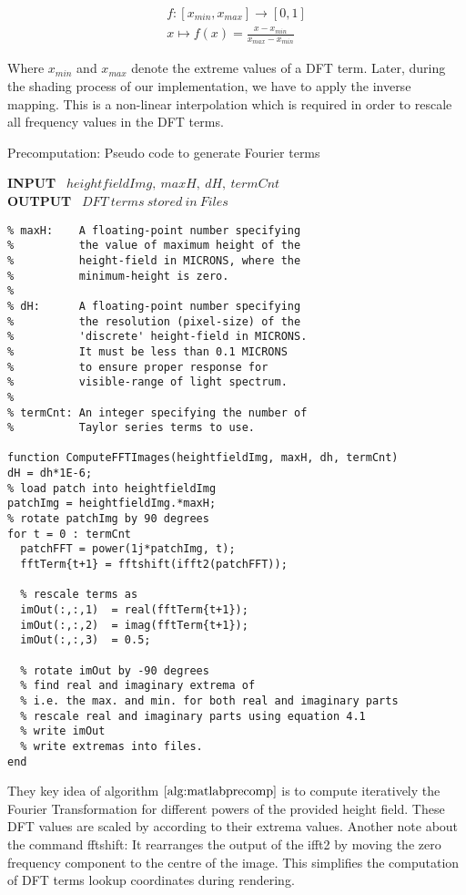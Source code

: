 \begin{align}
  f:\left[x_{min},x_{max}\right]\to \left[0,1\right] \nonumber\\
  x \mapsto f(x) = \frac{x-x_{min}}{x_{max}-x_{min}}
\label{eq:dfttermnormalization}
\end{align}

Where $x_{min}$ and $x_{max}$ denote the extreme values of a DFT term. Later, during the shading process of our implementation, we have to apply the inverse mapping. This is a non-linear interpolation which is required in order to rescale all frequency values in the DFT terms. 

\begin{algorithm}[H]
\caption{Precomputation: Pseudo code to generate Fourier terms}
\textbf{INPUT} \ $heightfieldImg, \ maxH, \ dH, \ termCnt$ \\
\textbf{OUTPUT} \ $DFT \ terms \ stored \ in \ Files$
\begin{lstlisting}
% maxH:    A floating-point number specifying 
%          the value of maximum height of the 
%          height-field in MICRONS, where the 
%          minimum-height is zero. 
%         
% dH:      A floating-point number specifying 
%          the resolution (pixel-size) of the 
%          'discrete' height-field in MICRONS. 
%          It must be less than 0.1 MICRONS 
%          to ensure proper response for 
%          visible-range of light spectrum.
%
% termCnt: An integer specifying the number of 
%          Taylor series terms to use.

function ComputeFFTImages(heightfieldImg, maxH, dh, termCnt)
dH = dh*1E-6;
% load patch into heightfieldImg
patchImg = heightfieldImg.*maxH;
% rotate patchImg by 90 degrees
for t = 0 : termCnt
  patchFFT = power(1j*patchImg, t);
  fftTerm{t+1} = fftshift(ifft2(patchFFT));
  
  % rescale terms as
  imOut(:,:,1)  = real(fftTerm{t+1});
  imOut(:,:,2)  = imag(fftTerm{t+1});
  imOut(:,:,3)  = 0.5;
  
  % rotate imOut by -90 degrees
  % find real and imaginary extrema of 
  % i.e. the max. and min. for both real and imaginary parts
  % rescale real and imaginary parts using equation 4.1
  % write imOut 
  % write extremas into files.
end
\end{lstlisting}
\label{alg:matlabprecomp}
\end{algorithm}

They key idea of algorithm $\ref{alg:matlabprecomp}$ is to compute iteratively the Fourier Transformation for different powers of the provided height field. These DFT values are scaled by according to their extrema values. Another note about the command fftshift: It rearranges the output of the ifft2 by moving the zero frequency component to the centre of the image. This simplifies the computation of DFT terms lookup coordinates during rendering.

